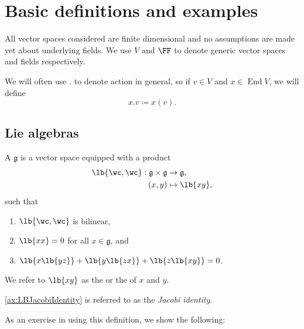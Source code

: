 \documentclass{article}
\DeclarePairedDelimiter\lb\lbrack\rbrack
\DeclareMathOperator{\End}{End}
\newcommand*\frkg{{\ensuremath{\mathfrak{g}}}}
\newcommand*\acts{.}
\begin{document}
\newpage

\section{
Basic definitions and examples 
\texorpdfstring{\cite[\S 1]{Hum72}}{[Hum.\S 1]}
}

\begin{convention}
    All vector spaces considered are finite dimensional and no assumptions are made yet about underlying fields.
    We use $V$ and $\FF$ to denote generic vector spaces and fields respectively.

    We will often use $\acts$ to denote action in general, so if $v \in V$ and $x \in \End V$, we will define
    \[
        x \acts v
        \coloneq
        x(v).
    \]
\end{convention}

\subsection{Lie algebras}

\begin{definition}
    A  $\frkg$ is a vector space equipped with a product
    \begin{align*}
        \lb{\wc,\wc}: \frkg \times \frkg
        &\to
        \frkg,
        \\
        (x,y)
        &\mapsto
        \lb{xy},
    \end{align*}
    such that
    \begin{enumerate}[label=(L\arabic*)]
        \item 
            \label{ax:LBIsBilinear}
            $\lb{\wc,\wc}$ is bilinear,
        \item 
            \label{ax:LBNilpotent}
            $\lb{xx} = 0$ for all $x \in \frkg$, and
        \item 
            \label{ax:LBJacobiIdentity}
            $\lb{x\lb{yz}} + \lb{y\lb{zx}} + \lb{z\lb{xy}} = 0$.
    \end{enumerate}
    We refer to $\lb{xy}$ as the  or the  of $x$ and $y$.
\end{definition}

\ref{ax:LBJacobiIdentity} is referred to as the \textit{Jacobi identity}.

As an exercise in using this definition, we show the following:
\end{document}
